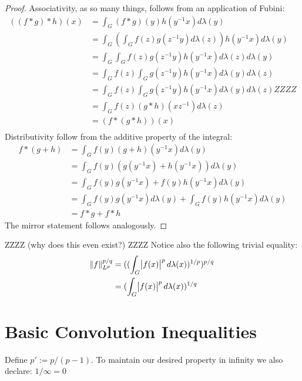 \begin{proof}
Associativity, as so many things, follows from an application of Fubini:
\begin{align*}
((f \ast g) \ast  h )(x) &= \int_G (f \ast g)(y) h(y^{-1}x) d\lambda(y) \\
&= \int_G ( \int_G f(z)g(z^{-1}y)d\lambda(z)) h(y^{-1}x)d\lambda(y) \\
&= \int_G  \int_G f(z)g(z^{-1}y) h(y^{-1}x)d\lambda(z) d\lambda(y) \\
&= \int_G  f(z) \int_G g(z^{-1}y) h(y^{-1}x)d\lambda(y) d\lambda(z) \\
&= \int_G  f(z) \int_G g(z^{-1}y) h(y^{-1}x)d\lambda(y) d\lambda(z) ZZZZ\\
&= \int_G  f(z) (g \ast h)(xz^{-1}) d\lambda(z) \\
&= (f \ast (g \ast  h ))(x) \\
\end{align*}
Distributivity follow from the additive property of the integral:
\begin{align*}
f \ast (g + h) &= \int_G f(y) (g+h)(y^{-1}x)d\lambda(y)\\
&= \int_G f(y) (g(y^{-1}x)+h(y^{-1}x))d\lambda(y)\\
&= \int_G f(y)g(y^{-1}x)+f(y)h(y^{-1}x)d\lambda(y)\\
&= \int_G f(y)g(y^{-1}x) d\lambda(y) + \int_G f(y)h(y^{-1}x) d\lambda(y)\\
&= f \ast g + f \ast h
\end{align*}
The mirror statement follows analogously. 
\end{proof}

\begin{remark}
ZZZZ (why does this even exist?)  ZZZZ Notice also the following trivial equality:\begin{align*}
\norm{f}^{p/q}_{L^p} &= (( \int_G \abs{f(x)}^p d\lambda(x) )^{1/p} ) ^ {p/q} \\
&= (\int_G \abs{f(x)}^p d\lambda(x) )^{1/q}
\end{align*}
\end{remark}

\section{Basic Convolution Inequalities}

\begin{definition}
Define $ p' := p / (p-1) $. To maintain our desired property in infinity we also declare: $1 / \infty = 0$
\end{definition}

